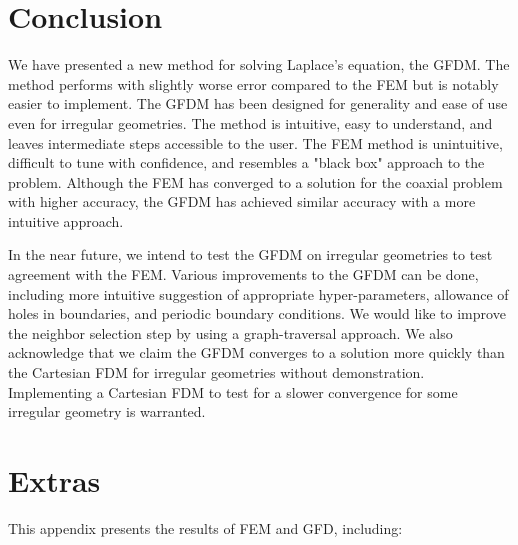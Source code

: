 \documentclass{PoS}
\begin{document}
\section{Conclusion}
We have presented a new method for solving Laplace's equation, the GFDM. The method performs with slightly worse error compared to the FEM but is notably easier to implement. The GFDM has been designed for generality and ease of use even for irregular geometries. The method is intuitive, easy to understand, and leaves intermediate steps accessible to the user. The FEM method is unintuitive, difficult to tune with confidence, and resembles a "black box" approach to the problem. Although the FEM has converged to a solution for the coaxial problem with higher accuracy, the GFDM has achieved similar accuracy with a more intuitive approach.

In the near future, we intend to test the GFDM on irregular geometries to test agreement with the FEM. Various improvements to the GFDM can be done, including more intuitive suggestion of appropriate hyper-parameters, allowance of holes in boundaries, and periodic boundary conditions. We would like to improve the neighbor selection step by using a graph-traversal approach. We also acknowledge that we claim the GFDM converges to a solution more quickly than the Cartesian FDM for irregular geometries without demonstration. Implementing a Cartesian FDM to test for a slower convergence for some irregular geometry is warranted.

\FloatBarrier
\newpage




\appendix

\section{Extras}

This appendix presents the results of FEM and GFD, including:
\end{document}
